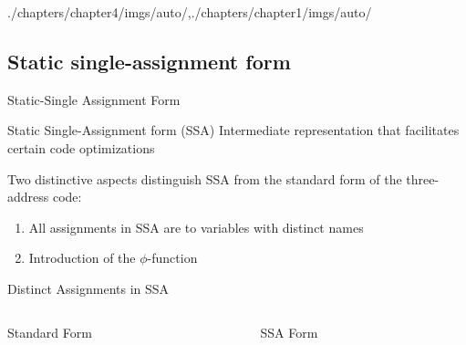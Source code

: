 \begin{graphicspathcontext}{{./chapters/chapter4/imgs/auto/},{./chapters/chapter1/imgs/auto/}}
\begin{bibunit}[apalike]
\subsection{Static single-assignment form}
\subsectiontableofcontentslide

\begin{frame}{{Static-Single Assignment} Form}
	\begin{definitionblock}{Static Single-Assignment form (SSA)}
		 Intermediate representation that facilitates certain code optimizations
	\end{definitionblock}
	\vspace{3em}
	Two distinctive aspects distinguish SSA from the standard form of the three-address code:
	\begin{enumerate}
	\item All assignments in SSA are to variables with distinct names
	\item Introduction of the $\phi$-function
	\end{enumerate}
\end{frame}

\begin{frame}[background=8]{{Distinct Assignments} in SSA}
	\vspace{.25cm}
	\begin{columns}
		\begin{column}{.5\linewidth}
			\begin{center}
			\begin{tac}[\linewidth]
			\end{tac}
			\vspace{1em}
			Standard Form
			\end{center}
		\end{column}
		\begin{column}{.5\linewidth}
			\begin{center}
			\begin{tac}[\linewidth]
			\end{tac}
			\vspace{1em}
			SSA Form
			\end{center}
		\end{column}
	\end{columns}
\end{frame}


\end{bibunit}
\end{graphicspathcontext}
